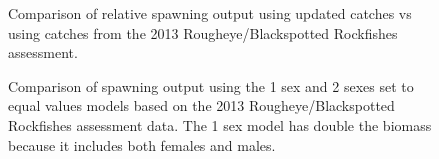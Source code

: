 \documentclass[
]{scrartcl}
\begin{document}
\begin{figure}[H]


\caption{\label{fig-Ct_compsRSS}Comparison of relative spawning output
using updated catches vs using catches from the 2013
Rougheye/Blackspotted Rockfishes assessment.}

\end{figure}%

\newpage

\begin{figure}[H]


\caption{\label{fig-Sex1vs2_SO}Comparison of spawning output using the 1
sex and 2 sexes set to equal values models based on the 2013
Rougheye/Blackspotted Rockfishes assessment data. The 1 sex model has
double the biomass because it includes both females and males.}

\end{figure}%
\end{document}
